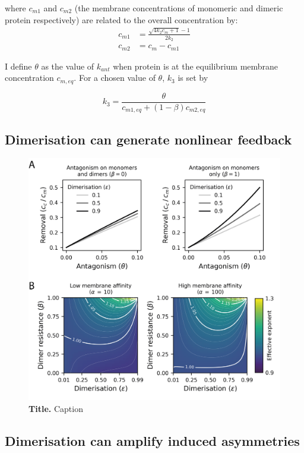 \documentclass[12pt]{"report"}
\newcommand{\mycaption}[2]{\caption[#1]{\textbf{#1.} #2}}
\begin{document}
where $c_{m1}$ and $c_{m2}$ (the membrane concentrations of monomeric and dimeric protein respectively) are related to the overall concentration by:
\begin{align}
c_{m1} &= \frac{\sqrt{4 k_2 c_{m} + 1} - 1}{2 k_2} \\
c_{m2} &= c_{m} - c_{m1}
\end{align}

I define $\theta$ as the value of $k_{ant}$ when protein is at the equilibrium membrane concentration $c_{m,eq}$. For a chosen value of $\theta$, $k_3$ is set by

\begin{equation}
k_3 = \frac{\theta}{c_{m1,eq} + (1 - \beta) c_{m2,eq}}
\end{equation}


\subsection{Dimerisation can generate nonlinear feedback}

\begin{figure}
\includegraphics[scale=1]{model_antagonism_effective_exponent}
\centering
\mycaption{Title}{Caption}
\label{fig:model_antagonism_effective_exponent}
\end{figure}


\subsection{Dimerisation can amplify induced asymmetries}
\end{document}

